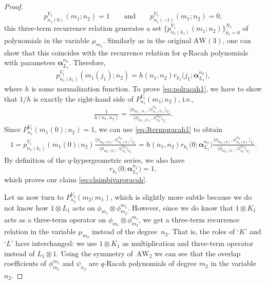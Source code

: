 \documentclass[10pt,a4paper]{amsart}
\numberwithin{equation}{section}
\newcommand{\aw}{\mathrm{AW}\!\left(3\right)}
\newcommand{\AW}[1]{\mathrm{AW}_{#1}}
\begin{document}
\begin{proof}
	\[
	p_{n_1(0)}^{V_1}(m_1;n_2)=1 \qquad \text{and}\qquad p_{n_1(-1)}^{V_1}(m_1;n_2)=0,
	\]
	this three-term recurrence relation generates a set $\big\{p_{n_1(k_1)}^{V_1}(m_1;n_2)\big\}_{k_1=0}^{N_1}$ of polynomials in the variable $\mu_{m_1}$. Similarly as in the original $\aw$, one can show that this coincides with the recurrence relation for $q$-Racah polynomials with parameters $\bm{\alpha}_{L_1}^{n_2}$. Therefore,
	\begin{gather}
		p_{n_1(k_1)}^{V_1}(m_1(j_1);n_2)=h(n_1,n_2)r_{k_1}\big(j_1;\bm{\alpha}_{L_1}^{n_2}\big),\label{eq:3termqracah1}
	\end{gather}
	where $h$ is some normalization function. To prove \eqref{eq:polracah1}, we have to show that $1/h$ is exactly the right-hand side of $P_{n_1}^{V_1}(m_1;n_2)$, i.e.,
	\begin{gather}
		\frac{1}{h(n_1,n_2)}=\frac{\big\langle \phi_{m_1(0)},\psi_{n_1(0)}^{n_2}\big\rangle _{V_1}}{\big\langle \phi_{m_1(0)},\psi_{n_1}^{n_2}\big\rangle _{V_1}}.\label{eq:claimbivarqracah}
	\end{gather}
	Since $P_{n_1}^{V_1}(m_1(0);n_2)=1$, we can use \eqref{eq:3termqracah1} to obtain
	\begin{gather*}
		1=p_{n_1(k_1)}^{V_1}(m_1(0);n_2)\frac{\big\langle \phi_{m_1(0)},\psi_{n_1(0)}^{n_2}\big\rangle _{V_1}}{\big\langle \phi_{m_1(0)},\psi_{n_1}^{n_2}\big\rangle _{V_1}} = h(n_1,n_2)r_{k_1}\big(0;\bm{\alpha}_{L_1}^{n_2}\big)\frac{\big\langle \phi_{m_1(0)},\psi_{n_1(0)}^{n_2}\big\rangle _{V_1}}{\big\langle \phi_{m_1(0)},\psi_{n_1}^{n_2}\big\rangle _{V_1}}.
	\end{gather*}
	By definition of the $q$-hypergeometric series, we also have
	\[r_{k_1}\big(0;\bm{\alpha}_{L_1}^{n_2}\big)=1,\]
	which proves our claim \eqref{eq:claimbivarqracah}.
	
	Let us now turn to $P_{n_2}^{V_2}(m_2;m_1)$, which is slightly more subtle because we do not know how $1\otimes L_1$ acts on $\phi_{m_1}\otimes\phi_{m_2}^{m_1}$. However, since we do know that $1\otimes K_1$ acts as a three-term operator on $\phi_{m_1}\otimes\phi_{m_2}^{m_1}$, we get a three-term recurrence relation in the variable $\mu_{m_2}$ instead of the degree~$n_2$. That is, the roles of `$K$' and `$L$' have interchanged: we use $1\otimes K_1$ as multiplication and three-term operator instead of $L_1\otimes 1$. Using the symmetry of~$\AW{2}$ we can see that the overlap coefficients of $\phi_{m_2}^{m_1}$ and $\psi_{n_2}$ are $q$-Racah polynomials of degree $m_2$ in the variable $n_2$.
	

\end{proof}
\end{document}
